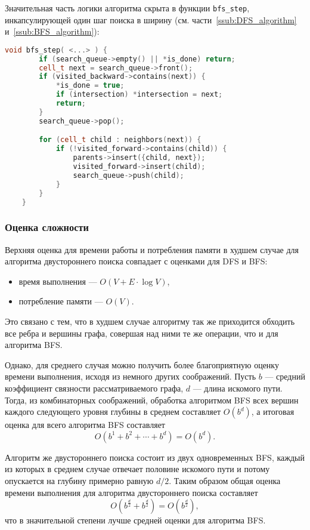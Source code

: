 \documentclass[a4paper, 12pt]{article}
\begin{document}
Значительная часть логики алгоритма скрыта в функции \verb|bfs_step|, инкапсулирующей один шаг поиска в ширину (см. части~\ref{ssub:DFS_algorithm} и~\ref{ssub:BFS_algorithm}):
\begin{lstlisting}[language=C++]
    void bfs_step( <...> ) {
        if (search_queue->empty() || *is_done) return;
        cell_t next = search_queue->front();
        if (visited_backward->contains(next)) {
            *is_done = true;
            if (intersection) *intersection = next;
            return;
        }
        search_queue->pop();

        for (cell_t child : neighbors(next)) {
            if (!visited_forward->contains(child)) {
                parents->insert({child, next});
                visited_forward->insert(child);
                search_queue->push(child);
            }
        }
    }
\end{lstlisting}

\subsubsection{Оценка сложности}
\label{ssub:bi_BFS_complexity}
Верхняя оценка для времени работы и потребления памяти в худшем случае для алгоритма двустороннего поиска совпадает с оценками для DFS и BFS:
\begin{itemize}
    \item время выполнения --- \({ O(V + E \cdot \log V) }\),
    \item потребление памяти --- \({ O(V) }\).
\end{itemize}
Это связано с тем, что в худшем случае алгоритму так же приходится обходить все ребра и вершины графа, совершая над ними те же операции, что и для алгоритма BFS.

Однако, для среднего случая можно получить более благоприятную оценку времени выполнения, исходя из немного других соображений. Пусть \({ b }\) --- средний коэффициент связности рассматриваемого графа, \({ d }\) --- длина искомого пути. Тогда, из комбинаторных соображений, обработка алгоритмом BFS всех вершин каждого следующего уровня глубины в среднем составляет \({ O(b^d) }\), а итоговая оценка для всего алгоритма BFS составляет
\[
    O(b^1 + b^2 + \cdots + b^d) = O(b^d).
\]

Алгоритм же двустороннего поиска состоит из двух одновременных BFS, каждый из которых в среднем случае отвечает половине искомого пути и потому опускается на глубину примерно равную \({ d/2 }\). Таким образом общая оценка времени выполнения для алгоритма двустороннего поиска составляет
\[
    O(b^{\frac{d}{2}} + b^{\frac{d}{2}}) = O(b^{\frac{d}{2}}),
\]
что в значительной степени лучше средней оценки для алгоритма BFS.
\end{document}
